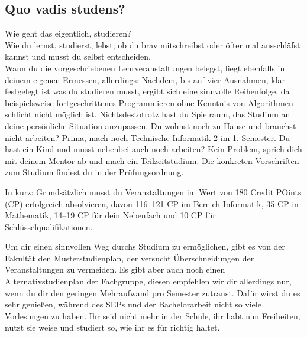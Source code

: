 \subsection{Quo vadis studens?}

Wie geht das eigentlich, studieren?\\
Wie du lernst, studierst, lebst; ob du brav mitschreibst oder öfter mal ausschläfst kannst und musst du selbst entscheiden. \\
Wann du die vorgeschriebenen Lehrveranstaltungen belegst, liegt ebenfalls in deinem eigenen Ermessen, allerdings: Nachdem, bis auf vier Ausnahmen, klar festgelegt ist was du studieren musst, ergibt sich eine sinnvolle Reihenfolge, da beispielsweise fortgeschrittenes Programmieren ohne Kenntnis von Algorithmen schlicht nicht möglich ist. Nichtsdestotrotz hast du Spielraum, das Studium an deine persönliche Situation anzupassen.
Du wohnst noch zu Hause und brauchst nicht arbeiten? Prima, mach noch Technische Informatik 2 im 1. Semester. Du hast ein Kind und musst nebenbei auch noch arbeiten? Kein Problem, sprich dich mit deinem Mentor ab und mach ein Teilzeitstudium. Die konkreten Vorschriften zum Studium findest du in der Prüfungsordnung.

In kurz: Grundsätzlich musst du Veranstaltungen im Wert von 180 Credit POints (CP) erfolgreich absolvieren, davon 116–121 CP im Bereich Informatik, 35 CP in Mathematik, 14–19 CP für dein Nebenfach und 10 CP für Schlüsselqualifikationen.

Um dir einen sinnvollen Weg durchs Studium zu ermöglichen, gibt es von der Fakultät den Musterstudienplan, der versucht Überschneidungen der Veranstaltungen zu vermeiden. Es gibt aber auch noch einen Alternativstudienplan der Fachgruppe, diesen empfehlen wir dir allerdings nur, wenn du dir den geringen Mehraufwand pro Semester zutraust. Dafür wirst du es sehr genießen, während des SEPs und der Bachelorarbeit nicht so viele Vorlesungen zu haben. 
Ihr seid nicht mehr in der Schule, ihr habt nun Freiheiten, nutzt sie weise und studiert so, wie ihr es für richtig haltet.